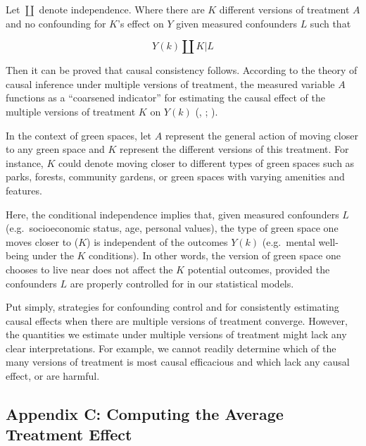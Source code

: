 \documentclass[
  singlecolumn]{article}
\begin{document}
Let \(\coprod\) denote independence. Where there are \(K\) different
versions of treatment \(A\) and no confounding for \(K\)'s effect on
\(Y\) given measured confounders \(L\) such that

\[
Y(k) \coprod K | L
\]

Then it can be proved that causal consistency follows. According to the
theory of causal inference under multiple versions of treatment, the
measured variable \(A\) functions as a ``coarsened indicator'' for
estimating the causal effect of the multiple versions of treatment \(K\)
on \(Y(k)\) (,
;
).

In the context of green spaces, let \(A\) represent the general action
of moving closer to any green space and \(K\) represent the different
versions of this treatment. For instance, \(K\) could denote moving
closer to different types of green spaces such as parks, forests,
community gardens, or green spaces with varying amenities and features.

Here, the conditional independence implies that, given measured
confounders \(L\) (e.g.~socioeconomic status, age, personal values), the
type of green space one moves closer to (\(K\)) is independent of the
outcomes \(Y(k)\) (e.g.~mental well-being under the \(K\) conditions).
In other words, the version of green space one chooses to live near does
not affect the \(K\) potential outcomes, provided the confounders \(L\)
are properly controlled for in our statistical models.

Put simply, strategies for confounding control and for consistently
estimating causal effects when there are multiple versions of treatment
converge. However, the quantities we estimate under multiple versions of
treatment might lack any clear interpretations. For example, we cannot
readily determine which of the many versions of treatment is most causal
efficacious and which lack any causal effect, or are harmful.

\subsection{Appendix C: Computing the Average Treatment
Effect}\label{appendix-c-computing-the-average-treatment-effect}
\end{document}
